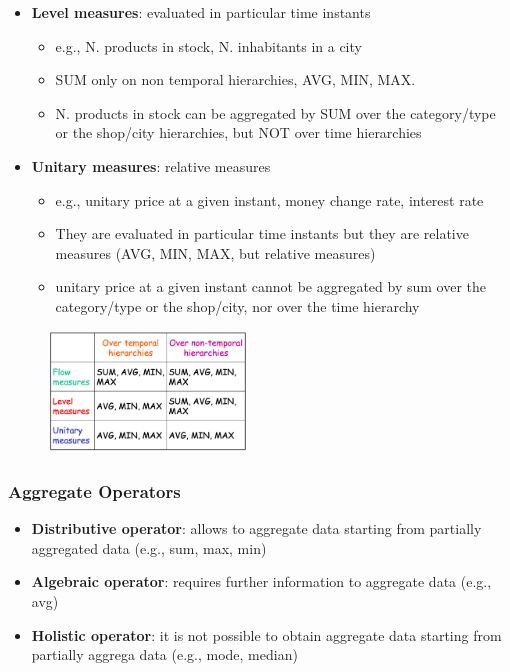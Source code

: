 \documentclass[10pt,a4paper]{article}
\begin{document}
\begin{justify}
\begin{itemize}
	\item \textbf{Level measures}: evaluated in particular time instants
	\begin{itemize}
		\item e.g., N. products in stock, N. inhabitants in a city
		\item SUM only on non temporal hierarchies, AVG, MIN, MAX.
		\item N. products in stock can be aggregated by SUM over the category/type or the shop/city hierarchies, but NOT over time hierarchies
\end{itemize}
	\item \textbf{Unitary measures}: relative measures 
	\begin{itemize}
		\item e.g., unitary price at a given instant, money change rate, interest rate
		\item They are evaluated in particular time instants but they are relative measures  (AVG, MIN, MAX, but relative measures)
		\item unitary price at a given instant cannot be aggregated by sum over the category/type or the shop/city, nor over the time hierarchy
	\end{itemize}		
\end{itemize}
\begin{figure}[htp]
\center
\includegraphics[width=150pt]{images/measures-categories}\hfill
\end{figure}
\subsubsection{Aggregate Operators}
\begin{itemize}
	\item \textbf{Distributive operator}: allows to aggregate data starting from partially aggregated data (e.g., sum, max, min)
	\item \textbf{Algebraic operator}: requires further information to aggregate data (e.g., avg)
	\item \textbf{Holistic operator}: it is not possible to obtain aggregate data starting from partially aggrega data (e.g., mode, median)
\end{itemize}

\end{justify}
\end{document}
